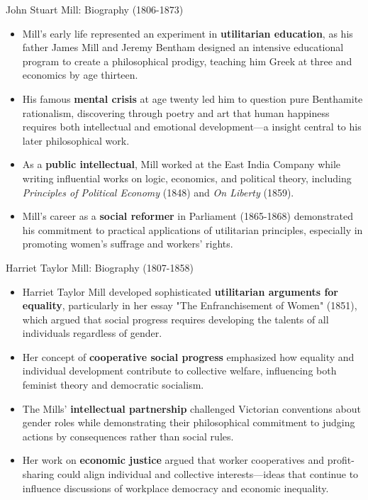 \documentclass[aspectratio=169]{beamer}
\begin{document}
\begin{frame}{John Stuart Mill: Biography (1806-1873)}
    \begin{itemize}
        \item Mill's early life represented an experiment in \textbf{utilitarian education}, as his father James Mill and Jeremy Bentham designed an intensive educational program to create a philosophical prodigy, teaching him Greek at three and economics by age thirteen.
        
        \item His famous \textbf{mental crisis} at age twenty led him to question pure Benthamite rationalism, discovering through poetry and art that human happiness requires both intellectual and emotional development—a insight central to his later philosophical work.
        
        \item As a \textbf{public intellectual}, Mill worked at the East India Company while writing influential works on logic, economics, and political theory, including \textit{Principles of Political Economy} (1848) and \textit{On Liberty} (1859).
        
        \item Mill's career as a \textbf{social reformer} in Parliament (1865-1868) demonstrated his commitment to practical applications of utilitarian principles, especially in promoting women's suffrage and workers' rights.
    \end{itemize}
\end{frame}

\begin{frame}{Harriet Taylor Mill: Biography (1807-1858)}
    \begin{itemize}
        \item Harriet Taylor Mill developed sophisticated \textbf{utilitarian arguments for equality}, particularly in her essay "The Enfranchisement of Women" (1851), which argued that social progress requires developing the talents of all individuals regardless of gender.
        
        \item Her concept of \textbf{cooperative social progress} emphasized how equality and individual development contribute to collective welfare, influencing both feminist theory and democratic socialism.
        
        \item The Mills' \textbf{intellectual partnership} challenged Victorian conventions about gender roles while demonstrating their philosophical commitment to judging actions by consequences rather than social rules.
        
        \item Her work on \textbf{economic justice} argued that worker cooperatives and profit-sharing could align individual and collective interests—ideas that continue to influence discussions of workplace democracy and economic inequality.
    \end{itemize}
\end{frame}
\end{document}
